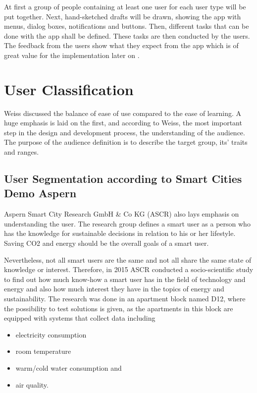 At first a group of people containing at least one user for each user type will be put together.  Next, hand-sketched drafts will be drawn, showing the app with menus, dialog boxes, notifications and buttons. Then, different tasks that can be done with the app shall be defined. These tasks are then conducted by the users. The feedback from the users show what they expect from the app which is of great value for the implementation later on \cite{snyder2003paper}.




\section{User Classification}


Weiss \cite{weiss2003handheld} discussed the balance of ease of use compared to the ease of learning. A huge emphasis is laid on the first, and according to Weiss, the most important step in the design and development process, the understanding of the audience. The purpose of the audience definition is to describe the target group, its' traits and ranges.

\subsection{User Segmentation according to Smart Cities Demo Aspern}

Aspern Smart City Research GmbH \& Co KG (ASCR) also lays emphasis on understanding the user. The research group defines a smart user as a person who has the knowledge for sustainable decisions in relation to his or her lifestyle. Saving CO2 and energy should be the overall goals of a smart user.

Nevertheless, not all smart users are the same and not all share the same state of knowledge or interest. Therefore, in 2015 ASCR conducted a socio-scientific study to find out how much know-how a smart user has in the field of technology and energy and also how much interest they have in the topics of energy and sustainability. The research was done in an apartment block named D12, where the possibility to test solutions is given, as the apartments in this block are equipped with systems that collect data including

\begin{itemize}
	\item electricity consumption
	\item room temperature
	\item warm/cold water consumption and
	\item air quality.
\end{itemize}

